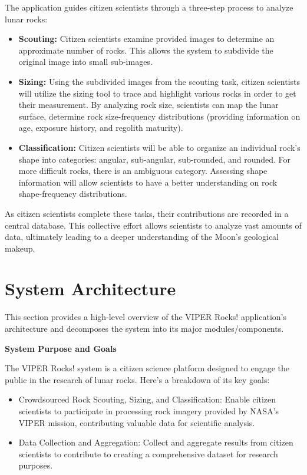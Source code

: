 \documentclass{article}
\begin{document}
The application guides citizen scientists through a three-step process to analyze lunar rocks:
\begin{itemize}
	\item \textbf{Scouting:} Citizen scientists examine provided images to determine an approximate number of rocks. This allows the system to subdivide the original image into small sub-images.
	\item \textbf{Sizing:} Using the subdivided images from the scouting task, citizen scientists will utilize the sizing tool to trace and highlight various rocks in order to get their measurement. By analyzing rock size, scientists can map the lunar surface, determine rock size-frequency distributions (providing information on age, exposure history, and regolith maturity).
	\item \textbf{Classification:} Citizen scientists will be able to organize an individual rock’s shape into categories: angular, sub-angular, sub-rounded, and rounded. For more difficult rocks, there is an ambiguous category. Assessing shape information will allow scientists to have a better understanding on rock shape-frequency distributions.
\end{itemize}
As citizen scientists complete these tasks, their contributions are recorded in a central database.
This collective effort allows scientists to analyze vast amounts of data, ultimately leading to a
deeper understanding of the Moon’s geological makeup.

\section{System Architecture}
This section provides a high-level overview of the VIPER Rocks! application’s architecture and decomposes the system into its major modules/components.

\textbf{System Purpose and Goals}

The VIPER Rocks! system is a citizen science platform designed to engage the public in the research of lunar rocks. Here’s a breakdown of its key goals:
\begin{itemize}
	\item Crowdsourced Rock Scouting, Sizing, and Classification: Enable citizen scientists to participate in processing rock imagery provided by NASA’s VIPER mission, contributing valuable data for scientific analysis.
	\item Data Collection and Aggregation: Collect and aggregate results from citizen scientists to contribute to creating a comprehensive dataset for research purposes. 
\end{itemize}
\end{document}
